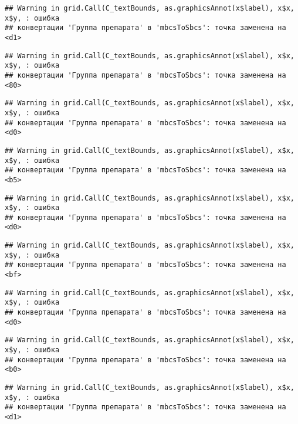 \documentclass[
]{article}
\begin{document}
\begin{verbatim}
## Warning in grid.Call(C_textBounds, as.graphicsAnnot(x$label), x$x, x$y, : ошибка
## конвертации 'Группа препарата' в 'mbcsToSbcs': точка заменена на <d1>
\end{verbatim}

\begin{verbatim}
## Warning in grid.Call(C_textBounds, as.graphicsAnnot(x$label), x$x, x$y, : ошибка
## конвертации 'Группа препарата' в 'mbcsToSbcs': точка заменена на <80>
\end{verbatim}

\begin{verbatim}
## Warning in grid.Call(C_textBounds, as.graphicsAnnot(x$label), x$x, x$y, : ошибка
## конвертации 'Группа препарата' в 'mbcsToSbcs': точка заменена на <d0>
\end{verbatim}

\begin{verbatim}
## Warning in grid.Call(C_textBounds, as.graphicsAnnot(x$label), x$x, x$y, : ошибка
## конвертации 'Группа препарата' в 'mbcsToSbcs': точка заменена на <b5>
\end{verbatim}

\begin{verbatim}
## Warning in grid.Call(C_textBounds, as.graphicsAnnot(x$label), x$x, x$y, : ошибка
## конвертации 'Группа препарата' в 'mbcsToSbcs': точка заменена на <d0>
\end{verbatim}

\begin{verbatim}
## Warning in grid.Call(C_textBounds, as.graphicsAnnot(x$label), x$x, x$y, : ошибка
## конвертации 'Группа препарата' в 'mbcsToSbcs': точка заменена на <bf>
\end{verbatim}

\begin{verbatim}
## Warning in grid.Call(C_textBounds, as.graphicsAnnot(x$label), x$x, x$y, : ошибка
## конвертации 'Группа препарата' в 'mbcsToSbcs': точка заменена на <d0>
\end{verbatim}

\begin{verbatim}
## Warning in grid.Call(C_textBounds, as.graphicsAnnot(x$label), x$x, x$y, : ошибка
## конвертации 'Группа препарата' в 'mbcsToSbcs': точка заменена на <b0>
\end{verbatim}

\begin{verbatim}
## Warning in grid.Call(C_textBounds, as.graphicsAnnot(x$label), x$x, x$y, : ошибка
## конвертации 'Группа препарата' в 'mbcsToSbcs': точка заменена на <d1>
\end{verbatim}
\end{document}
